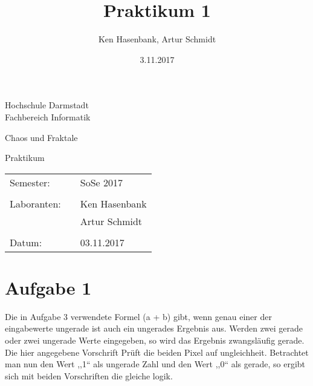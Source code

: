 \documentclass[10pt,a4paper]{article}
\author{Ken Hasenbank, Artur Schmidt}
\title{Praktikum 1}
\date{3.11.2017}
\begin{document}

\begin{titlepage}
\begin{center}
	\Large{Hochschule Darmstadt}\\
	\large{Fachbereich Informatik}
\end{center}

\vspace{1cm}
\begin{center}
	\large{Chaos und Fraktale}
\end{center}

\vspace{2,5cm}
\begin{center}
	\huge{Praktikum}\\
\end{center}



\vspace{6cm}
\begin{center}
{\large 
\begin{tabular}{lll}
	Semester: && SoSe 2017\\
	\vspace{1mm}\\
	Laboranten: && Ken Hasenbank\\
	&& Artur Schmidt\\
	\vspace{1 mm}\\
	Datum:	&& 03.11.2017\\
	\end{tabular} 
	}%
\end{center}

\end{titlepage}

\section{Aufgabe 1}
Die in Aufgabe 3 verwendete Formel (a + b) gibt, wenn genau einer der eingabewerte ungerade ist auch ein ungerades Ergebnis aus. Werden zwei gerade oder zwei ungerade Werte eingegeben, so wird das Ergebnis zwangsläufig gerade.
\\
Die hier angegebene Vorschrift Prüft die beiden Pixel auf ungleichheit.
Betrachtet man nun den Wert ,,1`` als ungerade Zahl und den Wert ,,0`` als gerade, so ergibt sich mit beiden Vorschriften die gleiche logik.
\end{document}
